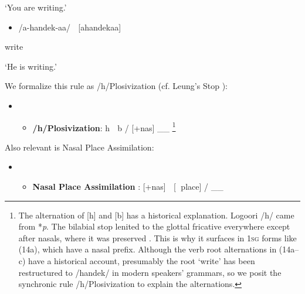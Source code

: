 \begin{styleListParagraph}
\textsc{‘}You are writing.’
\end{styleListParagraph}

\begin{itemize}
\item \begin{styleListParagraph}
/a-handek-aa/    [ahandekaa]
\end{styleListParagraph}
\end{itemize}
\begin{styleListParagraph}
write
\end{styleListParagraph}

\begin{styleListParagraph}
\textsc{‘}He is writing.’
\end{styleListParagraph}

We formalize this rule as /h/Plosivization (cf. Leung’s Stop \citet[117]{Formation1991}):

\setcounter{itemize}{0}
\begin{itemize}
\item \setcounter{itemize}{0}
\begin{itemize}
\item \begin{styleListParagraph}
\textbf{/h/Plosivization}: h  b / [+nas] \_\_ \footnote{   The alternation of [h] and [b] has a historical explanation. Logoori /h/ came from *\textit{p}. The bilabial stop lenited to the glottal fricative everywhere except after nasals, where it was preserved \citep{Hyman2003}. This is why it surfaces in 1\textsc{sg} forms like (14a), which have a nasal prefix. Although the verb root alternations in (14a–c) have a historical account, presumably the root ‘write’ has been restructured to /handek/ in modern speakers’ grammars, so we posit the synchronic rule /h/Plosivization to explain the alternations.}
\end{styleListParagraph}
\end{itemize}
\end{itemize}

Also relevant is Nasal Place Assimilation:

\begin{itemize}
\item \setcounter{itemize}{0}
\begin{itemize}
\item \begin{styleListParagraph}
\textbf{Nasal Place Assimilation }\citep[116]{Leung1991}: [+nas]  [ place] / \_\_ 
\end{styleListParagraph}
\end{itemize}
\end{itemize}

